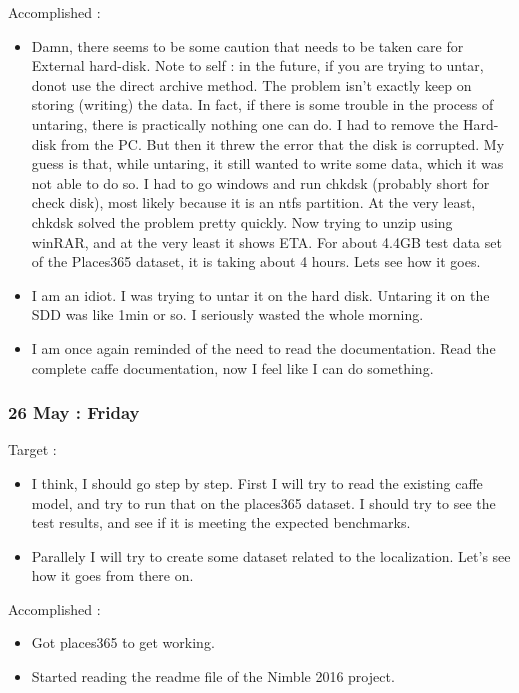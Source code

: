 \documentclass{article}
\begin{document}
Accomplished :
\begin{itemize}
\item Damn, there seems to be some caution that needs to be taken care for External hard-disk. Note to self : in the future, if you are trying to untar, donot use the direct archive method. The problem isn't exactly keep on storing (writing) the data. In fact, if there is some trouble in the process of untaring, there is practically nothing one can do. I had to remove the Hard-disk from the PC. But then it threw the error that the disk is corrupted. My guess is that, while untaring, it still wanted to write some data, which it was not able to do so. I had to go windows and run chkdsk (probably short for check disk), most likely because it is an ntfs partition. At the very least, chkdsk solved the problem pretty quickly. Now trying to unzip using winRAR, and at the very least it shows ETA. For about 4.4GB test data set of the Places365 dataset, it is taking about 4 hours. Lets see how it goes.
\item I am an idiot. I was trying to untar it on the hard disk. Untaring it on the SDD was like 1min or so. I seriously wasted the whole morning.
\item I am once again reminded of the need to read the documentation. Read the complete caffe documentation, now I feel like I can do something.
\end{itemize}

\subsubsection{26 May : Friday}
Target :
\begin{itemize}
\item I think, I should go step by step. First I will try to read the existing caffe model, and try to run that on the places365 dataset. I should try to see the test results, and see if it is meeting the expected benchmarks.
\item Parallely I will try to create some dataset related to the localization. Let's see how it goes from there on.
\end{itemize}

Accomplished :
\begin{itemize}
\item Got places365 to get working.
\item Started reading the readme file of the Nimble 2016 project.
\end{itemize}
\end{document}
